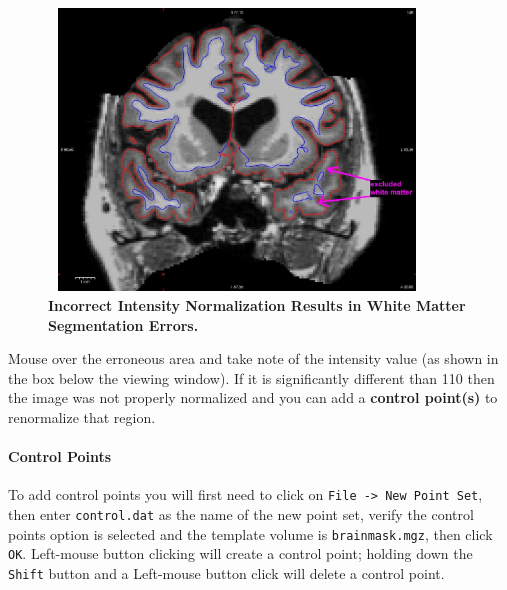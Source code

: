 \documentclass[paper=a4, fontsize=11pt]{scrartcl} %
\numberwithin{equation}{section} %
\numberwithin{figure}{section} %
\numberwithin{table}{section} %
\begin{document}
\begin{figure}[h]
\includegraphics[width=10cm, height=7.5cm]{FS_cp_before}
\caption{\textbf{Incorrect Intensity Normalization Results in White Matter \mbox{Segmentation} Errors.}}
\end{figure}

Mouse over the erroneous area and take note of the intensity value (as shown in the box below the viewing window).  If it is significantly different than 110 then the image was not properly normalized and you can add a \textbf{control point(s)} to renormalize that region. 

\paragraph{Control Points} To add control points you will first need to click on \texttt{File -> New Point Set}, then enter \texttt{control.dat} as the name of the new point set, verify the control points option is selected and the template volume is \texttt{brainmask.mgz}, then click \texttt{OK}. Left-mouse button clicking will create a control point; holding down the \texttt{Shift} button and a Left-mouse button click will delete a control point. 
\end{document}
